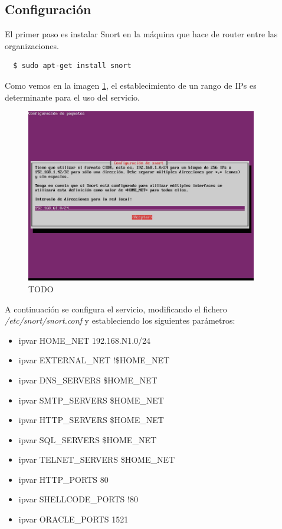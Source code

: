 \documentclass[a4,12pt,onecolum]{article}
\begin{document}
\subsection{Configuración}

El primer paso es instalar Snort en la máquina que hace de router entre las organizaciones.

\begin{verbatim}
  $ sudo apt-get install snort
\end{verbatim}

Como vemos en la imagen \ref{fig:snort1}, el establecimiento de un rango de IPs es determinante para el uso del servicio.

\begin{figure}[htbp]
\centering
\includegraphics[width=0.9\textwidth]{./images/SnortInstalacion.jpg}
\caption{TODO}
\label{fig:snort1}
\end{figure}

A continuación se configura el servicio, modificando el fichero \emph{/etc/snort/snort.conf} y estableciendo los siguientes parámetros:

\begin{itemize}
  \item ipvar HOME\_NET 192.168.N1.0/24
  \item ipvar EXTERNAL\_NET !\$HOME\_NET
  \item ipvar DNS\_SERVERS \$HOME\_NET
  \item ipvar SMTP\_SERVERS    \$HOME\_NET
  \item ipvar HTTP\_SERVERS    \$HOME\_NET
  \item ipvar SQL\_SERVERS     \$HOME\_NET
  \item ipvar TELNET\_SERVERS  \$HOME\_NET
  \item ipvar HTTP\_PORTS      80
  \item ipvar SHELLCODE\_PORTS !80
  \item ipvar ORACLE\_PORTS    1521
\end{itemize}
\end{document}
